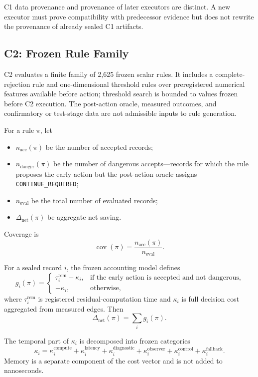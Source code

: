 C1 data provenance and provenance of later executors are distinct. A new executor must
prove compatibility with predecessor evidence but does not rewrite the provenance of
already sealed C1 artifacts.

\subsection{C2: Frozen Rule Family}

C2 evaluates a finite family of 2,625 frozen scalar rules. It includes a complete-
rejection rule and one-dimensional threshold rules over preregistered numerical
features available before action; threshold search is bounded to values frozen before
C2 execution. The post-action oracle, measured outcomes, and confirmatory or test-stage
data are not admissible inputs to rule generation.

For a rule \(\pi\), let
\begin{itemize}
  \item \(n_{\mathrm{acc}}(\pi)\) be the number of accepted records;
  \item \(n_{\mathrm{danger}}(\pi)\) be the number of dangerous accepts---records for which the rule proposes the early action but the post-action oracle assigns \texttt{CONTINUE\_REQUIRED};
  \item \(n_{\mathrm{eval}}\) be the total number of evaluated records;
  \item \(\Delta_{\mathrm{net}}(\pi)\) be aggregate net saving.
\end{itemize}
Coverage is
\[
  \operatorname{cov}(\pi)=\frac{n_{\mathrm{acc}}(\pi)}{n_{\mathrm{eval}}}.
\]

For a sealed record \(i\), the frozen accounting model defines
\[
  g_i(\pi)=
  \begin{cases}
    \tau_i^{\mathrm{rem}}-\kappa_i,&\text{if the early action is accepted and not dangerous},\\
    -\kappa_i,&\text{otherwise},
  \end{cases}
\]
where \(\tau_i^{\mathrm{rem}}\) is registered residual-computation time and
\(\kappa_i\) is full decision cost aggregated from measured edges. Then
\[
  \Delta_{\mathrm{net}}(\pi)=\sum_i g_i(\pi).
\]

The temporal part of \(\kappa_i\) is decomposed into frozen categories
\[
  \kappa_i=\kappa_i^{\mathrm{compute}}+\kappa_i^{\mathrm{latency}}+
  \kappa_i^{\mathrm{diagnostic}}+\kappa_i^{\mathrm{observer}}+
  \kappa_i^{\mathrm{control}}+\kappa_i^{\mathrm{fallback}}.
\]
Memory is a separate component of the cost vector and is not added to nanoseconds.

